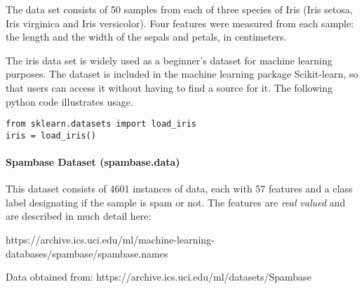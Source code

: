 \documentclass[12pt]{article}
\begin{document}
The data set consists of 50 samples from each of three species of Iris (Iris setosa, Iris virginica and Iris versicolor). Four features were measured from each sample: the length and the width of the sepals and petals, in centimeters.

\noindent
The iris data set is widely used as a beginner's dataset for machine learning purposes. The dataset is included in the machine learning package Scikit-learn, so that users can access it without having to find a source for it. The following python code illustrates usage.

\begin{lstlisting}
from sklearn.datasets import load_iris
iris = load_iris()
\end{lstlisting}


\paragraph{Spambase Dataset  (spambase.data)}
This dataset consists of 4601 instances of data, each with 57 features and a class label designating if the sample is spam or not.
The features are \emph{real valued} and are described in much detail here:
\begin{center}
  https://archive.ics.uci.edu/ml/machine-learning-databases/spambase/spambase.names\\
\end{center}

\noindent
Data obtained from:  https://archive.ics.uci.edu/ml/datasets/Spambase


\newpage
\end{document}
